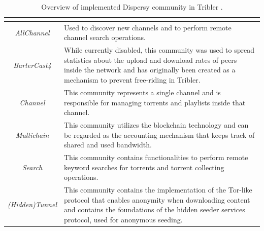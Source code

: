 \begin{table}[tbp]
	\centering
	\caption{Overview of implemented Dispersy community in Tribler \cite{2016:tribler-techdebt:vos}.}
	\label{tbl:community}
	\begin{tabular}{|c|p{11cm}|}
		\hline
		\rowcolor[HTML]{EFEFEF} 
		\multicolumn{1}{|c|}{\cellcolor[HTML]{EFEFEF}{\color[HTML]{333333} \textbf{Community Name}}} & \multicolumn{1}{c|}{\cellcolor[HTML]{EFEFEF}{\color[HTML]{333333} \textbf{Purpose}}}                                                                                                                                     \\ \hline
		\textit{AllChannel}                                                                          & Used to discover new channels and to perform remote channel search operations.                                                                                                                                           \\ \hline
		\textit{BarterCast4}                                                                         & While currently disabled, this community was used to spread statistics about the upload and download rates of peers inside the network and has originally been created as a mechanism to prevent free-riding in Tribler. \\ \hline
		\textit{Channel}                                                                             & This community represents a single channel and is responsible for managing torrents and playlists inside that channel.                                                                                                   \\ \hline
		\textit{Multichain}                                                                          & This community utilizes the blockchain technology and can be regarded as the accounting mechanism that keeps track of shared and used bandwidth.                                                                         \\ \hline
		\textit{Search}                                                                              & This community contains functionalities to perform remote keyword searches for torrents and torrent collecting operations.                                                                                               \\ \hline
		\textit{(Hidden)Tunnel}                                                                      & This community contains the implementation of the Tor-like protocol that enables anonymity when downloading content and contains the foundations of the hidden seeder services protocol, used for anonymous seeding.     \\ \hline
	\end{tabular}
\end{table}

